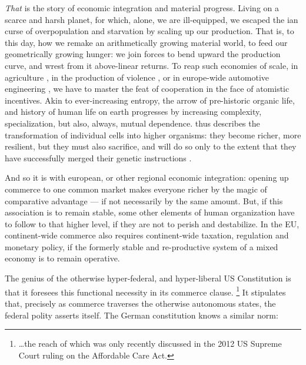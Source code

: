 \emph{That} is the story of economic integration and material progress.
Living on a scarce and harsh planet, for which, alone, we are ill-equipped, we escaped the \citeauthor{Malthus1798}ian curse of overpopulation and starvation by scaling up our production.
That is, to this day, how we remake an arithmetically growing material world, to feed our geometrically growing hunger:
we join forces to bend upward the production curve, and wrest from it above-linear returns.
To reap such economies of scale, in agriculture \citep{Diamond1997}, in the production of violence \citep{Tilly-1985-aa}, or in europe-wide automotive engineering \citep{Krugman-1980-aa}, we have to master the feat of cooperation in the face of atomistic incentives.
Akin to ever-increasing entropy, the arrow of pre-historic organic life, and history of human life on earth progresses by increasing complexity, specialization, but also, always, mutual dependence.
\citeauthor{Wright1994} thus describes the transformation of individual cells into higher organisms:
they become richer, more resilient, but they must also sacrifice, and will do so only to the extent that they have successfully merged their genetic instructions \citeyearpar[Chapters 7, 8]{Wright1994}.

And so it is with european, or other regional economic integration:
opening up commerce to one common market makes everyone richer by the magic of comparative advantage --- if not necessarily by the same amount.
But, if this association is to remain stable, some other elements of human organization have to follow to that higher level, if they are not to perish and destabilize.
In the \gls{EU}, continent-wide commerce also requires continent-wide taxation, regulation and monetary policy, if the formerly stable and re-productive system of a mixed economy is to remain operative.

The genius of the otherwise hyper-federal, and hyper-liberal US Constitution is that it foresees this functional necessity in its commerce clause.
\footnote{
	\ldots the reach of which was only recently discussed in the 2012 US Supreme Court ruling on the Affordable Care Act.
}
It stipulates that, precisely as commerce traverses the otherwise autonomous states, the federal polity asserts itself.
The German constitution knows a similar norm:


